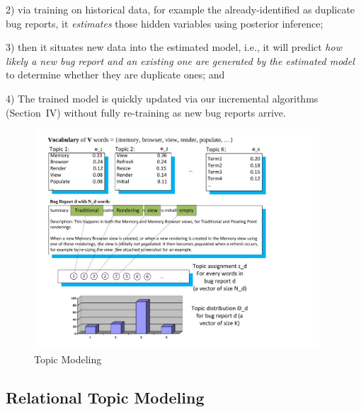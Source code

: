 2) via training on historical data, for example the already-identified
   as duplicate bug reports, it {\em estimates} those hidden variables
   using posterior inference;

3) then it situates new data into the estimated model, i.e., it will
   predict {\em how likely a new bug report and an existing one are
   generated by the estimated model} to determine whether they are
   duplicate ones; and

4) The trained model is quickly updated via our incremental algorithms
   (Section~IV) without fully re-training as new bug reports arrive.




\begin{figure}[t]
\centering
\includegraphics[width=4.2in]{irtm3}
\caption{Topic Modeling~\cite{lda}}
\label{topicmodel}
\end{figure}


\subsection{Relational Topic Modeling}

